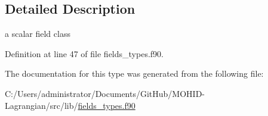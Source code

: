 \subsection{Detailed Description}
a scalar field class 

Definition at line 47 of file fields\+\_\+types.\+f90.



The documentation for this type was generated from the following file\+:\begin{DoxyCompactItemize}
\item 
C\+:/\+Users/administrator/\+Documents/\+Git\+Hub/\+M\+O\+H\+I\+D-\/\+Lagrangian/src/lib/\mbox{\hyperlink{fields__types_8f90}{fields\+\_\+types.\+f90}}\end{DoxyCompactItemize}
